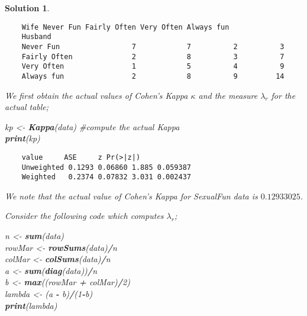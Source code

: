 \documentclass[12pt]{article}
\newenvironment{Shaded}{\begin{snugshade}}{\end{snugshade}}
\newcommand{\KeywordTok}[1]{\textcolor[rgb]{0.13,0.29,0.53}{\textbf{#1}}}
\newcommand{\DecValTok}[1]{\textcolor[rgb]{0.00,0.00,0.81}{#1}}
\newcommand{\StringTok}[1]{\textcolor[rgb]{0.31,0.60,0.02}{#1}}
\newcommand{\CommentTok}[1]{\textcolor[rgb]{0.56,0.35,0.01}{\textit{#1}}}
\newcommand{\OperatorTok}[1]{\textcolor[rgb]{0.81,0.36,0.00}{\textbf{#1}}}
\newcommand{\NormalTok}[1]{#1}
\theoremstyle{problemstyle}
\newtheorem*{solution*}{Solution}
\begin{document}
\begin{solution*}
\begin{enumerate}
	\begin{verbatim}
	Wife Never Fun Fairly Often Very Often Always fun
	Husband                                                       
	Never Fun                 7            7          2          3
	Fairly Often              2            8          3          7
	Very Often                1            5          4          9
	Always fun                2            8          9         14
	\end{verbatim}
	
	We first obtain the actual values of Cohen's Kappa \(\kappa\) and the
	measure \(\lambda_r\) for the actual table;
	
	\begin{Shaded}
			\NormalTok{kp \textless- }\StringTok{ }\KeywordTok{Kappa}\NormalTok{(data)   }\CommentTok{\#compute the actual Kappa }\\
			\KeywordTok{print}\NormalTok{(kp)}
	\end{Shaded}
	
	\begin{verbatim}
	value     ASE     z Pr(>|z|)
	Unweighted 0.1293 0.06860 1.885 0.059387
	Weighted   0.2374 0.07832 3.031 0.002437
	\end{verbatim}
	
	We note that the actual value of Cohen's Kappa for \emph{SexualFun} data
	is \(0.12933025\).
	
	Consider the following code which computes \(\lambda_r\);
	
	\begin{Shaded}
			\NormalTok{n \textless- }\StringTok{ }\KeywordTok{sum}\NormalTok{(data)}\\
			\NormalTok{rowMar \textless- }\StringTok{ }\KeywordTok{rowSums}\NormalTok{(data)}\OperatorTok{/}\NormalTok{n}\\
			\NormalTok{colMar \textless- }\StringTok{ }\KeywordTok{colSums}\NormalTok{(data)}\OperatorTok{/}\NormalTok{n}\\
			\NormalTok{a \textless- }\StringTok{ }\KeywordTok{sum}\NormalTok{(}\KeywordTok{diag}\NormalTok{(data))}\OperatorTok{/}\NormalTok{n}\\
			\NormalTok{b \textless- }\StringTok{ }\KeywordTok{max}\NormalTok{((rowMar }\OperatorTok{+}\StringTok{ }\NormalTok{colMar)}\OperatorTok{/}\DecValTok{2}\NormalTok{)}\\
			\NormalTok{lambda \textless-}\StringTok{ }\NormalTok{(a }\OperatorTok{-}\StringTok{ }\NormalTok{b)}\OperatorTok{/}\NormalTok{(}\DecValTok{1}\OperatorTok{-}\NormalTok{b)}\\
			\KeywordTok{print}\NormalTok{(lambda)}
	\end{Shaded}
	

\end{enumerate}
\end{solution*}
\end{document}
